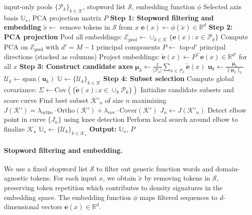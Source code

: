 \begin{algorithm*}[t]
\caption{Domain-Basis Synthesis (DBS)}
\label{alg:dbc}
\begin{algorithmic}[1]
\REQUIRE input-only pools $\{\mathcal{P}_k\}_{k\in\mathcal{K}}$, stopword list $\mathcal{S}$, embedding function $\phi$
\ENSURE Selected axis basis $\mathbb{U}_\star$, PCA projection matrix $P$
\STATE \textbf{Step 1: Stopword filtering and embedding}
        \STATE $\tilde{x} \leftarrow$ remove tokens in $\mathcal{S}$ from $x$
        \STATE $\mathbf{e}(x) \leftarrow \phi(\tilde{x}) \in \mathbb{R}^d$
    \ENDFOR
\ENDFOR
\STATE \textbf{Step 2: PCA projection}
\STATE Pool all embeddings: $\mathcal{E}_{\mathrm{pool}} \leftarrow \cup_{k\in\mathcal{K}} \{\mathbf{e}(x): x \in \mathcal{P}_k\}$
\STATE Compute PCA on $\mathcal{E}_{\mathrm{pool}}$ with $d' = M-1$ principal components
\STATE $P \leftarrow$ top-$d'$ principal directions (stacked as columns)
\STATE Project embeddings: $\tilde{\mathbf{e}}(x) \leftarrow P^\top \mathbf{e}(x) \in \mathbb{R}^{d'}$ for all $x$
\STATE \textbf{Step 3: Construct candidate axes}
    \STATE $\boldsymbol{\mu}_k \leftarrow \frac{1}{|\mathcal{P}_k|} \sum_{x \in \mathcal{P}_k} \tilde{\mathbf{e}}(x)$
    \STATE $\mathbf{u}_k \leftarrow \frac{\boldsymbol{\mu}_k}{\|\boldsymbol{\mu}_k\|_2}$ 
    \STATE $\mathcal{U}_k \leftarrow \mathrm{span}(\mathbf{u}_k)$
\ENDFOR
\STATE $\mathbb{U} \leftarrow \{\mathcal{U}_k\}_{k\in\mathcal{K}}$
\STATE \textbf{Step 4: Subset selection}
\STATE Compute global covariance: $\Sigma \leftarrow \mathrm{Cov}(\{\tilde{\mathbf{e}}(x): x \in \cup_k \mathcal{P}_k\})$
\STATE Initialize candidate subsets and score curve
    \STATE Find best subset $\mathcal{K}'_n$ of size $n$ maximizing $J(\mathcal{K}') = \lambda_{\mathrm{ortho}} \cdot \mathrm{Ortho}(\mathcal{K}') + \lambda_{\mathrm{cov}} \cdot \mathrm{Cover}(\mathcal{K}')$
    \STATE $J_n \leftarrow J(\mathcal{K}'_n)$
\ENDFOR
\STATE Detect elbow point in curve $\{J_n\}$ using knee detection
\STATE Perform local search around elbow to finalize $\mathcal{K}_\star$
\STATE $\mathbb{U}_\star \leftarrow \{\mathcal{U}_k\}_{k\in\mathcal{K}_\star}$
\STATE \textbf{Output:} $\mathbb{U}_\star$, $P$
\end{algorithmic}
\end{algorithm*}

\paragraph{Stopword filtering and embedding.}
We use a fixed stopword list $\mathcal{S}$ to filter out generic function words and domain-agnostic tokens.
For each input $x$, we obtain $\tilde{x}$ by removing tokens in $\mathcal{S}$, preserving token repetition which contributes to density signatures in the embedding space.
The embedding function $\phi$ maps filtered sequences to $d$-dimensional vectors $\mathbf{e}(x) \in \mathbb{R}^d$.

